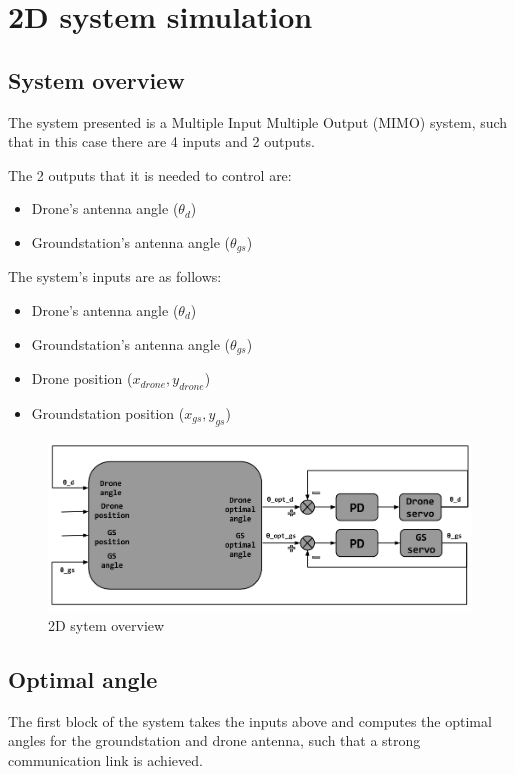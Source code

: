 \section{2D system simulation}

\subsection{System overview}
The system presented is a Multiple Input Multiple Output (MIMO) system, such that in this case there are 4 inputs and 2 outputs. 

The 2 outputs that it is needed to control are:
\begin{itemize}
	\item Drone's antenna angle ($\theta_{d}$)
	\item Groundstation's antenna angle ($\theta_{gs}$)
\end{itemize}

The system's inputs are as follows:
\begin{itemize}
	\item Drone's antenna angle ($\theta_{d}$)
	\item Groundstation's antenna angle ($\theta_{gs}$)
	\item Drone position ($x_{drone},y_{drone}$)
	\item Groundstation position ($x_{gs},y_{gs}$)
\end{itemize}

\begin{figure}
	\centering
	\includegraphics[scale=0.42]{figures/2d_system.png}
	\caption{2D sytem overview}
	\label{fig:2d_system}
\end{figure}

\subsection{Optimal angle}
The first block of the system takes the inputs above and computes the optimal angles for the groundstation and drone antenna, such that a strong communication link is achieved.  



